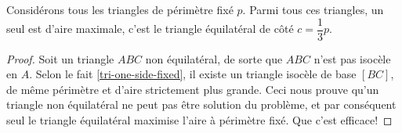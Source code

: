 \begin{fact}\label{iso-tri}
	Considérons tous les triangles de périmètre fixé $p$. Parmi tous ces triangles, un seul est d'aire maximale, c'est le triangle équilatéral de côté $c = \dfrac13 p$.
\end{fact}


\begin{proof}
	Soit un triangle $ABC$ non équilatéral, de sorte que $ABC$ n'est pas isocèle en $A$.
	Selon le fait \ref{tri-one-side-fixed}, il existe un triangle isocèle de base $[BC]$, de même périmètre et d'aire strictement plus grande.
	Ceci nous prouve qu'un triangle non équilatéral ne peut pas être solution du problème, et par conséquent seul le triangle équilatéral maximise l'aire à périmètre fixé. Que c'est efficace!
\end{proof}




